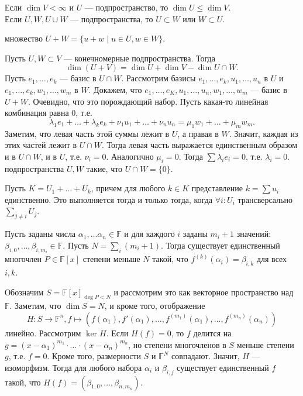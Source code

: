 \documentclass[12pt,a4paper]{article}
\begin{document}
\lemma Если $\dim V<\infty$ и $U$ --- подпространство, то $\dim U\leq\dim V$.\\

\lemma Если $U,W,U\cup W$ --- подпространства, то $U\subset W$ или $W\subset U$.

 множество $U+W=\{u+w\mid u\in U,w\in W\}$.

\theorem Пусть $U,W\subset V$ --- конечномерные подпространства. Тогда \[
	\dim(U+V)=\dim U+\dim V-\dim U\cap W.
\]
\proof Пусть $e_1,\ldots ,e_k$ --- базис в $U\cap W$. Рассмотрим базисы $e_1,\ldots ,e_k,u_1,\ldots ,u_n$ в $U$ и $e_1,\ldots ,e_k,w_1,\ldots ,w_m$ в $W$. Докажем, что $e_1,\ldots ,e_K,u_1,\ldots ,u_n,w_1,\ldots ,w_m$ --- базис в $U+W$. Очевидно, что это порождающий набор. Пусть какая-то линейная комбинация равна 0, т.е. \[
	\lambda_1e_1+\ldots +\lambda_ke_k+\nu_1u_1+\ldots +\nu_nu_n=\mu_1w_1+\ldots +\mu_mw_m.
\] Заметим, что левая часть этой суммы лежит в $U$, а правая в $W$. Значит, каждая из этих частей лежит в $U\cap W$. Тогда левая часть выражается единственным образом и в $U\cap W$, и в $U$, т.е. $\nu_i=0$. Аналогично $\mu_i=0$. Тогда $\sum \lambda_ie_i=0$, т.е. $\lambda_i=0$.\QEDA\\

 подпространства $U,W$ такие, что $U\cap W=\{0\}$.

\lemma Пусть $K=U_1+\ldots +U_k$, причем для любого $k\in K$ представление $k=\sum u_i$ единственно. Это выполняется тогда и только тогда, когда $\forall i:U_i$ трансверсально $\sum_{j\neq i} U_j$.

\newpage

 Пусть заданы числа $\alpha_1,\ldots \alpha_n\in \mathbb F $ и для каждого $i$ заданы $m_i+1$ значений: $\beta_{i,0},\ldots ,\beta_{i,m_i}\in \mathbb F $. Пусть $N=\sum_i (m_i+1)$. Тогда существует единственный многочлен $P\in \mathbb F [x]$ степени меньше $N$ такой, что $f^{(k)}(\alpha_i)=\beta_{i,k}$ для всех $i,k$.

\proof Обозначим $S=\mathbb F [x]_{\deg P< N}$ и рассмотрим это как векторное пространство над $\mathbb F $. Заметим, что $\dim S=N$, и кроме того, отображение \[
	H:S\to \mathbb F ^n,f\mapsto (f(\alpha_1),f'(\alpha_1),\ldots ,f^{(m_1)}(\alpha_1),\ldots ,f^{(m_n)}(\alpha_n))
\] линейно. Рассмотрим $\ker H$. Если $H(f)=0$, то $f$ делится на $g=(x-\alpha_1)^{m_1}\cdot \ldots \cdot (x-\alpha_n)^{m_n}$, но степени многочленов в $S$ меньше степени $g$, т.е. $f=0$. Кроме того, размерности $S$ и $\mathbb F ^N$ совпадают. Значит, $H$ --- изоморфизм. Тогда для любого набора $\alpha_i$ и $\beta_{i,j}$ существует единственный $f$ такой, что $H(f)=(\beta_{1,0},\ldots ,\beta_{n,m_n})$.\QEDA\\
\end{document}

